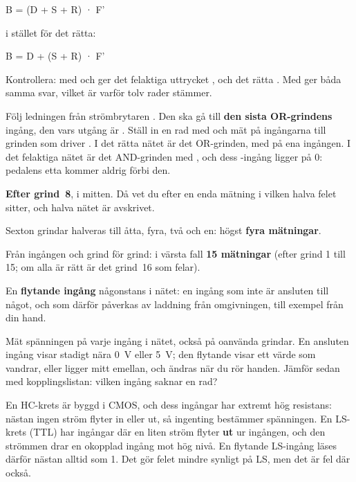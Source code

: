 \begin{textdrawing}
B = (D + S + R) · F'
\end{textdrawing}

\noindent i stället för det rätta:

\begin{textdrawing}
B = D + (S + R) · F'
\end{textdrawing}

\noindent Kontrollera: med  och  ger det felaktiga uttrycket
, och det rätta . Med  ger båda samma svar, vilket är
varför tolv rader stämmer.

Följ ledningen från strömbrytaren . Den ska gå till \textbf{den sista OR-grindens}
ingång, den vars utgång är . Ställ in en rad med  och mät på ingångarna
till grinden som driver . I det rätta nätet är det OR-grinden, med  på ena
ingången. I det felaktiga nätet är det AND-grinden med , och dess -ingång ligger
på 0: pedalens etta kommer aldrig förbi den.

\textbf{Efter grind~8}, i mitten. Då vet du efter en enda mätning i vilken halva felet
sitter, och halva nätet är avskrivet.

Sexton grindar halveras till åtta, fyra, två och en: högst \textbf{fyra mätningar}.

Från ingången och grind för grind: i värsta fall \textbf{15 mätningar} (efter grind 1 till
15; om alla är rätt är det grind~16 som felar).

En \textbf{flytande ingång} någonstans i nätet: en ingång som inte är ansluten till något, och
som därför påverkas av laddning från omgivningen, till exempel från din hand.

Mät spänningen på varje ingång i nätet, också på oanvända grindar. En ansluten ingång visar
stadigt nära 0~V eller 5~V; den flytande visar ett värde som vandrar, eller ligger mitt emellan,
och ändras när du rör handen. Jämför sedan med kopplingslistan: vilken ingång saknar en rad?

En HC-krets är byggd i CMOS, och dess ingångar har extremt hög resistans: nästan ingen ström
flyter in eller ut, så ingenting bestämmer spänningen. En LS-krets (TTL) har ingångar där en liten
ström flyter \textbf{ut} ur ingången, och den strömmen drar en okopplad ingång mot hög nivå. En
flytande LS-ingång läses därför nästan alltid som 1. Det gör felet mindre synligt på LS, men det är
fel där också.

